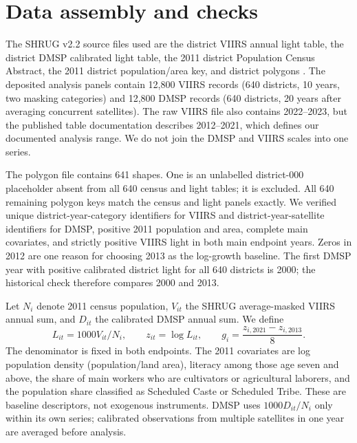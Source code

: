 \documentclass[11pt,a4paper]{article}
\begin{document}
\section{Data assembly and checks}
The SHRUG v2.2 source files used are the district VIIRS annual light table, the district DMSP calibrated light table, the 2011 district Population Census Abstract, the 2011 district population/area key, and district polygons \cite{shrugviirs,shrugdmsp,shruglicense}. The deposited analysis panels contain 12,800 VIIRS records (640 districts, 10 years, two masking categories) and 12,800 DMSP records (640 districts, 20 years after averaging concurrent satellites). The raw VIIRS file also contains 2022--2023, but the published table documentation describes 2012--2021, which defines our documented analysis range. We do not join the DMSP and VIIRS scales into one series.

The polygon file contains 641 shapes. One is an unlabelled district-000 placeholder absent from all 640 census and light tables; it is excluded. All 640 remaining polygon keys match the census and light panels exactly. We verified unique district-year-category identifiers for VIIRS and district-year-satellite identifiers for DMSP, positive 2011 population and area, complete main covariates, and strictly positive VIIRS light in both main endpoint years. Zeros in 2012 are one reason for choosing 2013 as the log-growth baseline. The first DMSP year with positive calibrated district light for all 640 districts is 2000; the historical check therefore compares 2000 and 2013.

Let $N_i$ denote 2011 census population, $V_{it}$ the SHRUG average-masked VIIRS annual sum, and $D_{it}$ the calibrated DMSP annual sum. We define
\begin{equation}
L_{it}=1000V_{it}/N_i,\qquad z_{it}=\log L_{it},\qquad
g_i=\frac{z_{i,2021}-z_{i,2013}}{8}.
\end{equation}
The denominator is fixed in both endpoints. The 2011 covariates are log population density (population/land area), literacy among those age seven and above, the share of main workers who are cultivators or agricultural laborers, and the population share classified as Scheduled Caste or Scheduled Tribe. These are baseline descriptors, not exogenous instruments. DMSP uses $1000D_{it}/N_i$ only within its own series; calibrated observations from multiple satellites in one year are averaged before analysis.
\end{document}
